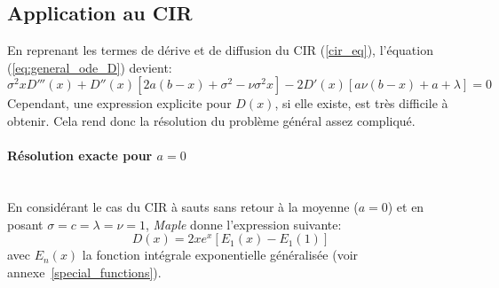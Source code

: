 \subsection{Application au CIR}
En reprenant les termes de dérive et de diffusion du \acs{CIR} (\ref{cir_eq}), l'équation (\ref{eq:general_ode_D}) devient:
\[
\sigma ^2 x D'''(x)+D''(x) \left[2 a (b-x)+\sigma ^2-\nu  \sigma ^2x\right]-2 D'(x) [a \nu  (b-x)+a+\lambda ]=0
\]
Cependant, une expression explicite pour $D(x)$, si elle existe, est très difficile à obtenir. Cela rend donc la résolution du problème général assez compliqué. 
\paragraph{Résolution exacte pour $a=0$}\phantom{}\\
En considérant le cas du \acs{CIR} à sauts sans retour à la moyenne ($a=0$) et en posant \(\sigma=c=\lambda=\nu=1\), \textit{Maple}  donne l'expression suivante:
\begin{equation}\label{overshoot_exact_sol}
    D(x)=2xe^{x}\left[E_1(x)-E_1(1)\right]
\end{equation}
avec $E_n(x)$ la fonction intégrale exponentielle généralisée (voir annexe~\ref{special_functions}).
